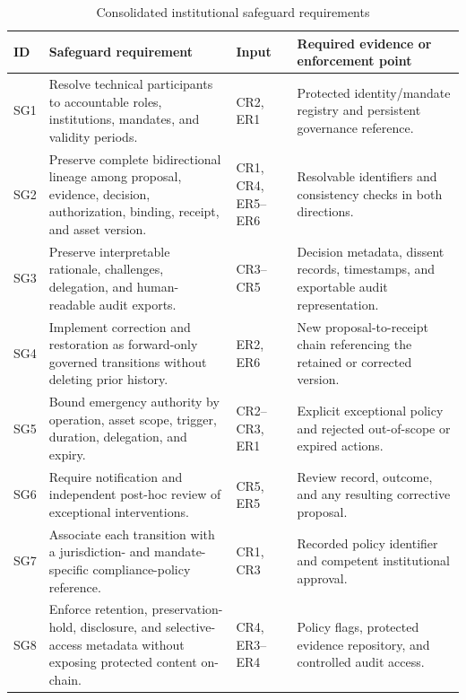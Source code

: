 \documentclass[journal]{IEEEtran}
\begin{document}
\begin{table}[t]
\caption{Consolidated institutional safeguard requirements}
\label{tab:institutional_safeguards}
\centering
\renewcommand{\arraystretch}{1.12}
\setlength{\tabcolsep}{4pt}
\begin{tabular}{p{1.0cm}p{6.1cm}p{2.2cm}p{6.9cm}}
\hline
\textbf{ID} &
\textbf{Safeguard requirement} &
\textbf{Input} &
\textbf{Required evidence or enforcement point}\\
\hline

SG1 &
Resolve technical participants to accountable roles,
institutions, mandates, and validity periods. &
CR2, ER1 &
Protected identity/mandate registry and persistent
governance reference.\\

SG2 &
Preserve complete bidirectional lineage among proposal,
evidence, decision, authorization, binding, receipt,
and asset version. &
CR1, CR4, ER5--ER6 &
Resolvable identifiers and consistency checks in
both directions.\\

SG3 &
Preserve interpretable rationale, challenges, delegation,
and human-readable audit exports. &
CR3--CR5 &
Decision metadata, dissent records, timestamps,
and exportable audit representation.\\

SG4 &
Implement correction and restoration as forward-only
governed transitions without deleting prior history. &
ER2, ER6 &
New proposal-to-receipt chain referencing the retained
or corrected version.\\

SG5 &
Bound emergency authority by operation, asset scope,
trigger, duration, delegation, and expiry. &
CR2--CR3, ER1 &
Explicit exceptional policy and rejected out-of-scope
or expired actions.\\

SG6 &
Require notification and independent post-hoc review
of exceptional interventions. &
CR5, ER5 &
Review record, outcome, and any resulting
corrective proposal.\\

SG7 &
Associate each transition with a jurisdiction- and
mandate-specific compliance-policy reference. &
CR1, CR3 &
Recorded policy identifier and competent
institutional approval.\\

SG8 &
Enforce retention, preservation-hold, disclosure,
and selective-access metadata without exposing
protected content on-chain. &
CR4, ER3--ER4 &
Policy flags, protected evidence repository,
and controlled audit access.\\


\end{tabular}
\end{table}
\end{document}
